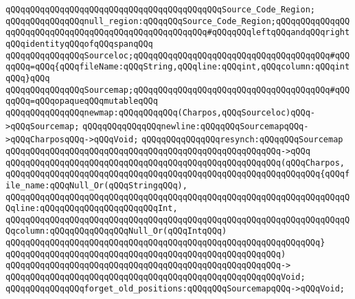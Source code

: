 \verb|qQQqqQQqqQQqqQQqqQQqqQQqqQQqqQQqqQQqqQQqqQQqSource_Code_Region;|\newline
\newline
\verb|qQQqqQQqqQQqqQQqnull_region:qQQqqQQqSource_Code_Region;qQQqqQQqqQQqqQQqqQQqqQQqqQQqqQQqqQQqqQQqqQQqqQQqqQQqqQQq#qQQqqQQqleftqQQqandqQQqrightqQQqidentityqQQqofqQQqspanqQQq|\newline
\newline
\verb|qQQqqQQqqQQqqQQqSourceloc;qQQqqQQqqQQqqQQqqQQqqQQqqQQqqQQqqQQqqQQq#qQQqqQQq=qQQq{qQQqfileName:qQQqString,qQQqline:qQQqint,qQQqcolumn:qQQqintqQQq}qQQq|\newline
\newline
\verb|qQQqqQQqqQQqqQQqSourcemap;qQQqqQQqqQQqqQQqqQQqqQQqqQQqqQQqqQQqqQQq#qQQqqQQq=qQQqopaqueqQQqmutableqQQq|\newline
\newline
\verb|qQQqqQQqqQQqqQQqnewmap:qQQqqQQqqQQq(Charpos,qQQqSourceloc)qQQq->qQQqSourcemap;|\newline
\verb|qQQqqQQqqQQqqQQqnewline:qQQqqQQqSourcemapqQQq->qQQqCharposqQQq->qQQqVoid;|\newline
\newline
\verb|qQQqqQQqqQQqqQQqresynch:qQQqqQQqSourcemap|\newline
\verb|qQQqqQQqqQQqqQQqqQQqqQQqqQQqqQQqqQQqqQQqqQQqqQQqqQQqqQQq->qQQq|\newline
\verb|qQQqqQQqqQQqqQQqqQQqqQQqqQQqqQQqqQQqqQQqqQQqqQQqqQQqqQQq(qQQqCharpos,|\newline
\verb|qQQqqQQqqQQqqQQqqQQqqQQqqQQqqQQqqQQqqQQqqQQqqQQqqQQqqQQqqQQqqQQq{qQQqfile_name:qQQqNull_Or(qQQqStringqQQq),|\newline
\verb|qQQqqQQqqQQqqQQqqQQqqQQqqQQqqQQqqQQqqQQqqQQqqQQqqQQqqQQqqQQqqQQqqQQqqQQqline:qQQqqQQqqQQqqQQqqQQqqQQqInt,|\newline
\verb|qQQqqQQqqQQqqQQqqQQqqQQqqQQqqQQqqQQqqQQqqQQqqQQqqQQqqQQqqQQqqQQqqQQqqQQqcolumn:qQQqqQQqqQQqqQQqNull_Or(qQQqIntqQQq)|\newline
\verb|qQQqqQQqqQQqqQQqqQQqqQQqqQQqqQQqqQQqqQQqqQQqqQQqqQQqqQQqqQQqqQQq}|\newline
\verb|qQQqqQQqqQQqqQQqqQQqqQQqqQQqqQQqqQQqqQQqqQQqqQQqqQQqqQQq)|\newline
\verb|qQQqqQQqqQQqqQQqqQQqqQQqqQQqqQQqqQQqqQQqqQQqqQQqqQQqqQQq->|\newline
\verb|qQQqqQQqqQQqqQQqqQQqqQQqqQQqqQQqqQQqqQQqqQQqqQQqqQQqqQQqVoid;|\newline
\newline
\verb|qQQqqQQqqQQqqQQqforget_old_positions:qQQqqQQqSourcemapqQQq->qQQqVoid;|\newline
